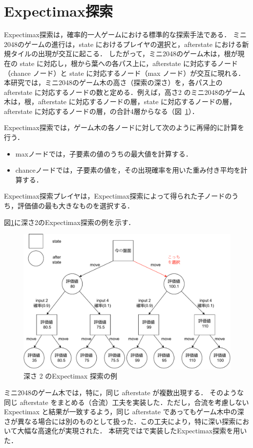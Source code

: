 \section{Expectimax探索}
\label{sec:expectimax}
Expectimax探索は，確率的一人ゲームにおける標準的な探索手法である．
ミニ2048のゲームの進行は，state におけるプレイヤの選択と，afterstate における新規タイルの出現が交互に起こる．
したがって，ミニ2048のゲーム木は，根が現在の state に対応し，根から葉への各パス上に，afterstate に対応するノード（chance ノード）と state に対応するノード（max ノード）が交互に現れる．本研究では，ミニ2048のゲーム木の高さ（探索の深さ）を，各パス上の afterstate に対応するノードの数と定める．例えば，高さ2 のミニ2048のゲーム木は，根，afterstate に対応するノードの層，state に対応するノードの層，afterstate に対応するノードの層，の合計4層からなる（図~\ref{result.Expectimax}）．

Expectimax探索では，ゲーム木の各ノードに対して次のように再帰的に計算を行う．
\begin{itemize}
 \item maxノードでは，子要素の値のうちの最大値を計算する．
 \item chanceノードでは，子要素の値を，その出現確率を用いた重み付き平均を計算する．
\end{itemize}
Expectimax探索プレイヤは，Expectimax探索によって得られた子ノードのうち，評価値の最も大きなものを選択する．

図\ref{result.Expectimax}に深さ2のExpectimax探索の例を示す．

\begin{figure}[t]
  \centering
  \includegraphics[width=.99\linewidth]{pdf/expectimax.pdf}
  \caption{深さ 2 のExpectimax 探索の例}
  \label{result.Expectimax} 
\end{figure}

ミニ2048のゲーム木では，特に，同じ afterstate が複数出現する．
そのような同じ afterstate をまとめる（合流）工夫を実装した．ただし，合流を考慮しない Expectimax と結果が一致するよう，同じ afterstate であってもゲーム木中の深さが異なる場合には別のものとして扱った．この工夫により，特に深い探索において大幅な高速化が実現された．
本研究では\cite{Terauchi24}で実装したExpectimax探索を用いた．
